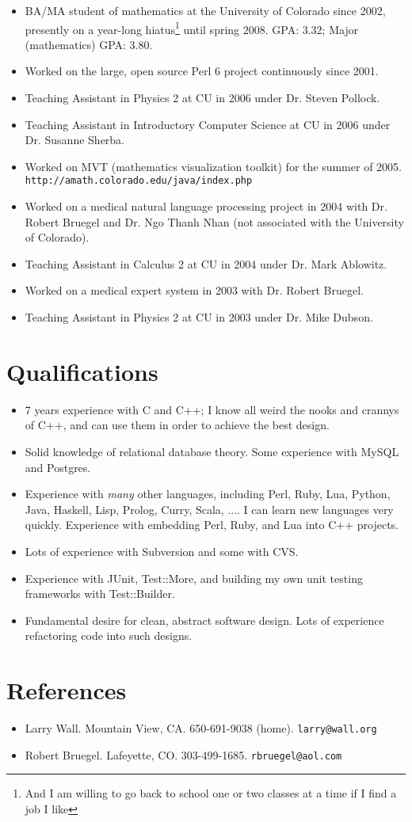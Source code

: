 \documentclass[12pt]{article}
\begin{document}
\begin{itemize}
\item BA/MA student of mathematics at the University of Colorado since
2002, presently on a year-long hiatus\footnote{And I am willing to go
back to school one or two classes at a time if I find a job I like}
until spring 2008.  GPA: 3.32; Major (mathematics) GPA: 3.80.  \item
Worked on the large, open source Perl 6 project continuously since
2001.
\item Teaching Assistant in Physics 2 at CU in 2006 under Dr. Steven
Pollock.
\item Teaching Assistant in Introductory Computer Science at CU in 2006
under Dr. Susanne Sherba.
\item Worked on MVT (mathematics visualization toolkit) for the summer
of 2005. \verb|http://amath.colorado.edu/java/index.php|
\item Worked on a medical natural language processing project in 2004 with
Dr. Robert Bruegel and Dr. Ngo Thanh Nhan (not associated with the
University of Colorado).
\item Teaching Assistant in Calculus 2 at CU in 2004 under Dr. Mark
Ablowitz.
\item Worked on a medical expert system in 2003 with Dr. Robert Bruegel.
\item Teaching Assistant in Physics 2 at CU in 2003 under Dr. Mike
Dubson.
\end{itemize}

\section*{Qualifications}

\begin{itemize}
\item 7 years experience with C and C++; I know all weird the nooks and
crannys of C++, and can use them in order to achieve the best design.
\item Solid knowledge of relational database theory.  Some experience
with MySQL and Postgres.
\item Experience with \textit{many} other languages, including Perl,
Ruby, Lua, Python, Java, Haskell, Lisp, Prolog, Curry, Scala, ....  I
can learn new languages very quickly.  Experience with embedding Perl,
Ruby, and Lua into C++ projects. 
\item Lots of experience with Subversion and some with CVS.
\item Experience with JUnit, Test::More, and building my own unit
testing frameworks with Test::Builder.
\item Fundamental desire for clean, abstract software design.  Lots of
experience refactoring code into such designs.
\end{itemize}

\section*{References}

\begin{itemize}
\item Larry Wall. Mountain View, CA.  650-691-9038 (home).
\verb|larry@wall.org|
\item Robert Bruegel.  Lafeyette, CO.  303-499-1685.
\verb|rbruegel@aol.com|
\end{itemize}
\end{document}
